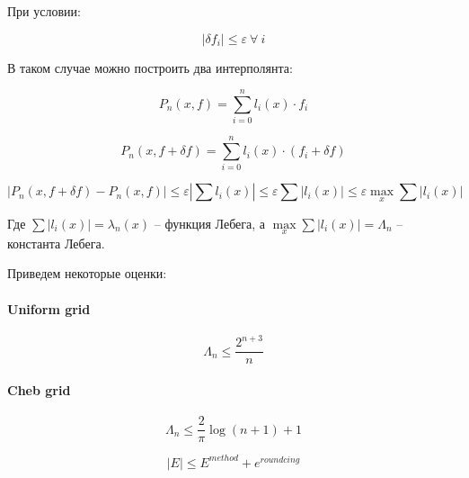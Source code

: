 \documentclass[10pt,a4paper]{article}
\begin{document}
	При условии:
	
	\begin{equation}
		\left|\delta f_{i}\right| \leqslant \varepsilon \ \forall \ i
	\end{equation}
	
	В таком случае можно построить два интерполянта:
	
	\begin{equation}
		P_{n}\left(x, f\right) = \sum\limits_{i = 0}^{n}l_{i}\left(x\right)\cdot
		f_{i}
	\end{equation}
		
	\begin{equation}
		P_{n}\left(x, f + \delta f\right) = \sum\limits_{i = 0}^{n}l_{i}\left(x
		\right)\cdot\left(f_{i} + \delta f\right)
	\end{equation}
	
	\begin{equation}
		\left|P_{n}\left(x, f + \delta f\right) - P_{n}\left(x, f\right)\right| 
		\leqslant \varepsilon \left|\sum l_{i}\left(x\right)\right| \leqslant
		\varepsilon \sum\left|l_{i}\left(x\right)\right| \leqslant
		\varepsilon \max\limits_{x} \sum\left|l_{i}\left(x\right)\right|
	\end{equation}
	
	Где $\sum\left|l_{i}\left(x\right)\right| = \lambda_{n}\left(x\right)$ --
	 функция Лебега, а 
	$\max\limits_{x} \sum\left|l_{i}\left(x\right)\right| = \Lambda_{n}$ --
	 константа Лебега.
	
	Приведем некоторые оценки:
	
	\paragraph{Uniform grid}
	
	\begin{equation}
		\Lambda_{n} \leqslant \frac{2^{n + 3}}{n}
	\end{equation}
	
	\paragraph{Cheb grid}
	
	\begin{equation}
		\Lambda_{n} \leqslant \frac{2}{\pi}\log\left(n + 1\right) + 1
	\end{equation}
	
	\begin{equation}
		\left|E\right| \leqslant E^{method} + e^{roundcing}
	\end{equation}
	
\end{document}
